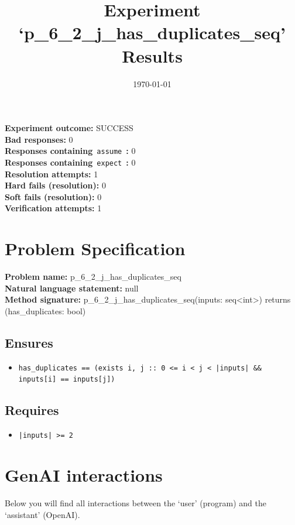 \documentclass{article}
\begin{document}
\title{Experiment `p\_6\_2\_j\_has\_duplicates\_seq' Results}
\author{\today}
\date{}
\maketitle
\textbf{Experiment outcome: }SUCCESS
\\\textbf{Bad responses: }0
\\\textbf{Responses containing}~\texttt{assume}~\textbf{: }0
\\\textbf{Responses containing}~\texttt{expect}~\textbf{: }0
\\\textbf{Resolution attempts: }1
\\\textbf{Hard fails (resolution): }0
\\\textbf{Soft fails (resolution): }0
\\\textbf{Verification attempts: }1
\section*{Problem Specification}
\textbf{Problem name: }p\_6\_2\_j\_has\_duplicates\_seq
\\\textbf{Natural language statement: }null
\\\textbf{Method signature: }p\_6\_2\_j\_has\_duplicates\_seq(inputs: seq<int>) returns (has\_duplicates: bool)
\subsection*{Ensures}
\begin{itemize}
\item \texttt{has\_duplicates == (exists i, j :: 0 <= i < j < |inputs| \&\& inputs[i] == inputs[j])}
\end{itemize}
\subsection*{Requires}
\begin{itemize}
\item \texttt{|inputs| >= 2}
\end{itemize}
\clearpage
\section*{GenAI interactions}
Below you will find all interactions between the `user' (program) and the `assistant' (OpenAI).
\end{document}
